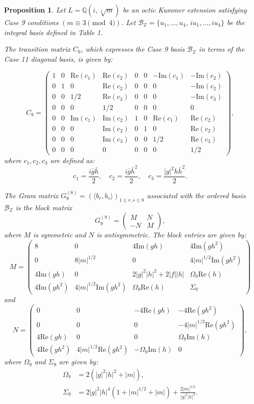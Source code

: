 \documentclass{amsart}
\theoremstyle{plain}
\newtheorem{proposition}[theorem]{Proposition}
\theoremstyle{definition}
\theoremstyle{remark}
\numberwithin{equation}{section}
\begin{document}
\begin{proposition}
Let $L = \mathbb{Q}(i, \sqrt[4]{m})$ be an octic Kummer extension satisfying Case 9 conditions $(m \equiv 3 \pmod 4)$. Let $\mathcal{B}_{\mathbb{Z}} = \{u_1, \dots, u_4, \, i u_1, \dots, i u_4\}$ be the integral basis defined in Table 1.

The transition matrix $C_{9}$, which expresses the Case 9 basis $\mathcal{B}_{\mathbb{Z}}$ in terms of the Case 11 diagonal basis, is given by:

\[
C_{9} = \begin{pmatrix}
1 & 0 & \text{Re}(c_1) & \text{Re}(c_2) & 0 & 0 & -\text{Im}(c_1) & -\text{Im}(c_2) \\
0 & 1 & 0 & \text{Re}(c_2) & 0 & 0 & 0 & -\text{Im}(c_2) \\
0 & 0 & 1/2 & \text{Re}(c_3) & 0 & 0 & 0 & -\text{Im}(c_3) \\
0 & 0 & 0 & 1/2 & 0 & 0 & 0 & 0 \\
0 & 0 & \text{Im}(c_1) & \text{Im}(c_2) & 1 & 0 & \text{Re}(c_1) & \text{Re}(c_2) \\
0 & 0 & 0 & \text{Im}(c_2) & 0 & 1 & 0 & \text{Re}(c_2) \\
0 & 0 & 0 & \text{Im}(c_3) & 0 & 0 & 1/2 & \text{Re}(c_3) \\
0 & 0 & 0 & 0 & 0 & 0 & 0 & 1/2
\end{pmatrix},
\]
where $c_1,c_2,c_3$ are defined as:
\[
c_1 = \frac{i\bar{g}\bar{h}}{2}, \quad c_2 = \frac{i\bar{g}\bar{h}^2}{2}, \quad c_3 = \frac{|g|^2 h \bar{h}^2}{2}.
\]

The Gram matrix $G_{9}^{(8)} = (\langle b_r, b_s \rangle)_{1\le r,s \le 8}$ associated with the ordered basis $\mathcal{B}_{\mathbb{Z}}$ is the block matrix
\[
G_{9}^{(8)} = \begin{pmatrix} M & N \\ -N & M \end{pmatrix},
\]
where $M$ is symmetric and $N$ is antisymmetric. The block entries are given by:
\[
M = \begin{pmatrix}
8 & 0 & 4\text{Im}(gh) & 4\text{Im}(gh^2) \\
0 & 8|m|^{1/2} & 0 & 4|m|^{1/2}\text{Im}(gh^2) \\
4\text{Im}(gh) & 0 & 2|g|^2|h|^2 + 2|f||h| & \Omega_9\text{Re}(h) \\
4\text{Im}(gh^2) & 4|m|^{1/2}\text{Im}(gh^2) & \Omega_9\text{Re}(h) & \Sigma_9
\end{pmatrix}
\]
and
\[
N = \begin{pmatrix}
0 & 0 & -4\text{Re}(gh) & -4\text{Re}(gh^2) \\
0 & 0 & 0 & -4|m|^{1/2}\text{Re}(gh^2) \\
4\text{Re}(gh) & 0 & 0 & \Omega_9\text{Im}(h) \\
4\text{Re}(gh^2) & 4|m|^{1/2}\text{Re}(gh^2) & -\Omega_9\text{Im}(h) & 0
\end{pmatrix},
\]
where $\Omega_{9}$ and $\Sigma_{9}$ are given by:
\begin{align*}
\Omega_9 &= 2(|g|^2|h|^2 + |m|), \\
\Sigma_9 &= 2|g|^2|h|^4 (1 + |m|^{1/2} + |m|) + \frac{2|m|^{3/2}}{|g|^2|h|^4}.
\end{align*}
\end{proposition}
\end{document}
